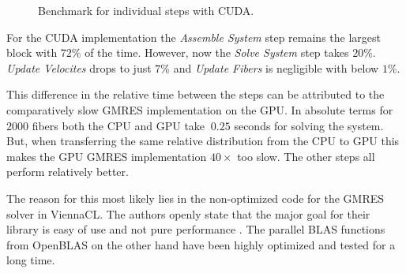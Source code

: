 \begin{figure}[!htbp]
  \centering
  \caption{Benchmark for individual steps with CUDA.}
  \label{fig:bench_cuda_steps}
\end{figure}

For the CUDA implementation the \emph{Assemble System} step remains the largest block with $72\%$ of the time. However, now the \emph{Solve System} step takes $20\%$. \emph{Update Velocites} drops to just $7\%$ and \emph{Update Fibers} is negligible with below $1\%$.

This difference in the relative time between the steps can be attributed to the comparatively slow GMRES implementation on the GPU. In absolute terms for $2000$ fibers both the CPU and GPU take $~0.25$ seconds for solving the system. But, when transferring the same relative distribution from the CPU to GPU this makes the GPU GMRES implementation $40×$ too slow. The other steps all perform relatively better.

The reason for this most likely lies in the non-optimized code for the GMRES solver in ViennaCL. The authors openly state that the major goal for their library is easy of use and not pure performance \cite{ViennaCLRupp2010}. The parallel BLAS functions from OpenBLAS on the other hand have been highly optimized and tested for a long time.


